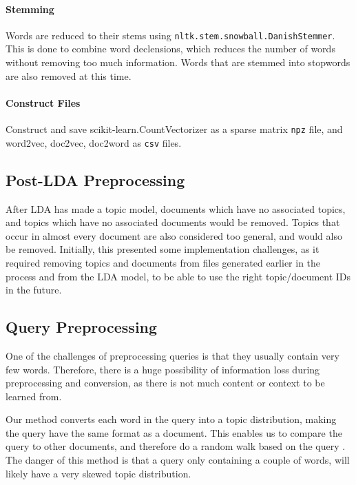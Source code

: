 \paragraph{Stemming}
Words are reduced to their stems using \texttt{nltk.stem.snowball.DanishStemmer}. 
This is done to combine word declensions, which reduces the number of words without removing too much information.
Words that are stemmed into stopwords are also removed at this time.

\paragraph{Construct Files}
Construct and save scikit-learn.CountVectorizer as a sparse matrix \texttt{npz} file, and word2vec, doc2vec, doc2word as \texttt{csv} files.

\subsection{Post-LDA Preprocessing}
After LDA has made a topic model, documents which have no associated topics, and topics which have no associated documents would be removed.
Topics that occur in almost every document are also considered too general, and would also be removed. 
Initially, this presented some implementation challenges, as it required removing topics and documents from files generated earlier in the process and from the LDA model, to be able to use the right topic/document IDs in the future.

\subsection{Query Preprocessing}
One of the challenges of preprocessing queries is that they usually contain very few words.
Therefore, there is a huge possibility of information loss during preprocessing and conversion, as there is not much content or context to be learned from.

Our method converts each word in the query into a topic distribution, making the query have the same format as a document. 
This enables us to compare the query to other documents, and therefore do a random walk based on the query .
The danger of this method is that a query only containing a couple of words, will likely have a very skewed topic distribution.
